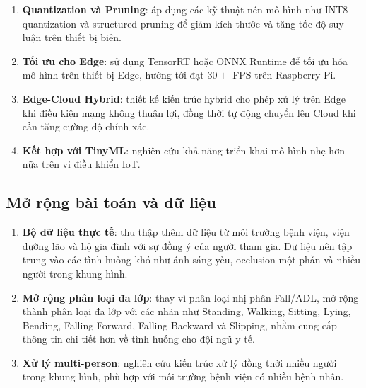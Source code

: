 \begin{enumerate}
    \item \textbf{Quantization và Pruning}: áp dụng các kỹ thuật nén mô hình như INT8 quantization và structured pruning để giảm kích thước và tăng tốc độ suy luận trên thiết bị biên.
    
    \item \textbf{Tối ưu cho Edge}: sử dụng TensorRT hoặc ONNX Runtime để tối ưu hóa mô hình trên thiết bị Edge, hướng tới đạt $30+$ FPS trên Raspberry Pi.
    
    \item \textbf{Edge-Cloud Hybrid}: thiết kế kiến trúc hybrid cho phép xử lý trên Edge khi điều kiện mạng không thuận lợi, đồng thời tự động chuyển lên Cloud khi cần tăng cường độ chính xác.
    
    \item \textbf{Kết hợp với TinyML}: nghiên cứu khả năng triển khai mô hình nhẹ hơn nữa trên vi điều khiển IoT.
\end{enumerate}

\subsection{Mở rộng bài toán và dữ liệu}
\label{sec:future_data}

\begin{enumerate}
    \item \textbf{Bộ dữ liệu thực tế}: thu thập thêm dữ liệu từ môi trường bệnh viện, viện dưỡng lão và hộ gia đình với sự đồng ý của người tham gia. Dữ liệu nên tập trung vào các tình huống khó như ánh sáng yếu, occlusion một phần và nhiều người trong khung hình.
    
    \item \textbf{Mở rộng phân loại đa lớp}: thay vì phân loại nhị phân Fall/ADL, mở rộng thành phân loại đa lớp với các nhãn như Standing, Walking, Sitting, Lying, Bending, Falling Forward, Falling Backward và Slipping, nhằm cung cấp thông tin chi tiết hơn về tình huống cho đội ngũ y tế.
    
    \item \textbf{Xử lý multi-person}: nghiên cứu kiến trúc xử lý đồng thời nhiều người trong khung hình, phù hợp với môi trường bệnh viện có nhiều bệnh nhân.
    
\end{enumerate}

